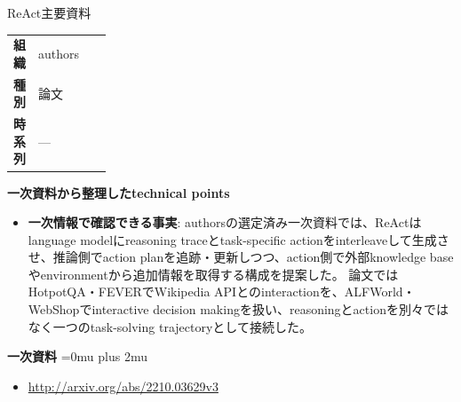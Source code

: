 \begin{technicalnote}{ReAct}{主要資料}
\begingroup
\begin{tabularx}{\linewidth}{@{}>{\bfseries}p{0.22\linewidth}X@{}}
組織 & authors \\
種別 & 論文 \\
時系列 & — \\
\end{tabularx}
\smallskip
{\bfseries 一次資料から整理したtechnical points}
\begin{itemize}[leftmargin=1.5em,itemsep=0.35em]
\item \textbf{一次情報で確認できる事実}: authorsの選定済み一次資料では、ReActはlanguage modelにreasoning traceとtask-specific actionをinterleaveして生成させ、推論側でaction planを追跡・更新しつつ、action側で外部knowledge baseやenvironmentから追加情報を取得する構成を提案した。 論文ではHotpotQA・FEVERでWikipedia APIとのinteractionを、ALFWorld・WebShopでinteractive decision makingを扱い、reasoningとactionを別々ではなく一つのtask-solving trajectoryとして接続した。
\end{itemize}
\begin{minipage}{\linewidth}
\begin{samepage}
{\bfseries 一次資料}
\begingroup\sloppy
\Urlmuskip=0mu plus 2mu\relax
\begin{itemize}[leftmargin=1.5em,itemsep=0.25em]
\item {\scriptsize\url{http://arxiv.org/abs/2210.03629v3}}
\end{itemize}
\endgroup
\end{samepage}
\end{minipage}
\endgroup
\end{technicalnote}
\medskip

